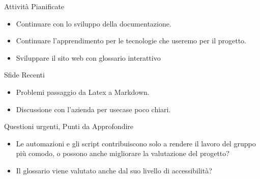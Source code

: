 \documentclass{beamer}
\begin{document}
\begin{frame}
    \begin{block}{Attività Pianificate}
        \begin{itemize}
            \item Continuare con lo sviluppo della documentazione.
            \item Continuare l'apprendimento per le tecnologie che useremo per il progetto.
            \item Sviluppare il sito web con glossario interattivo
        \end{itemize}
    \end{block}
\end{frame}

\begin{frame}
    \begin{alertblock}{Sfide Recenti}
        \begin{itemize}
            \item Problemi passaggio da Latex a Markdown.
            \item Discussione con l'azienda per usecase poco chiari.
        \end{itemize}
    \end{alertblock}
\end{frame}

\begin{frame}
    \begin{exampleblock}{Questioni urgenti, Punti da Approfondire}
        \begin{itemize}
            \item Le automazioni e gli script contribuiscono solo a rendere il lavoro del gruppo più comodo, o possono anche migliorare la valutazione del progetto?
            \item Il glossario viene valutato anche dal suo livello di accessibilità?
        \end{itemize}
    \end{exampleblock}
\end{frame}
\end{document}
